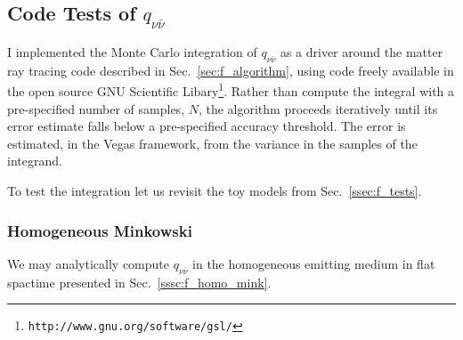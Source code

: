 \subsection{Code Tests of $q_{\nu\bar{\nu}}$}
\label{ssec:q_tests}
I implemented the Monte Carlo integration of $q_{\nu\bar{\nu}}$ as a driver
around the matter ray tracing code described in Sec.~\ref{sec:f_algorithm},
using code freely available in the open source GNU Scientific
Libary\footnote{\nolinkurl{http://www.gnu.org/software/gsl/}}.
Rather than compute the integral with a pre-specified number of samples, $N$,
the algorithm proceeds iteratively until its error estimate falls below
a pre-specified accuracy threshold.
The error is estimated, in the Vegas framework, from the variance in the
samples of the integrand. 

To test the integration let us revisit the toy models from
Sec.~\ref{ssec:f_tests}.

\subsubsection{Homogeneous Minkowski}
\label{sssc:q_homo_mink}
We may analytically compute $q_{\nu\bar{\nu}}$ in the homogeneous emitting
medium in flat spactime presented in Sec.~\ref{sssc:f_homo_mink}.

